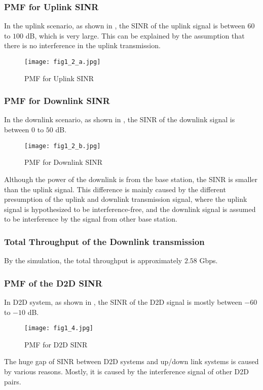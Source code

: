 \documentclass[conference]{IEEEtran}
\begin{document}
\subsubsection{PMF for Uplink SINR}
In the uplink scenario, as shown in , the SINR of the uplink signal is between $60$ to $100$ dB, which is very large. This can be explained by the assumption that there is no interference in the uplink transmission.
\begin{figure}[htbp]
    \centering
    \texttt{[image: fig1\_2\_a.jpg]}
    \caption{PMF for Uplink SINR}
    \label{fig:uplink_sinr}
\end{figure}

\subsubsection{PMF for Downlink SINR}
In the downlink scenario, as shown in , the SINR of the downlink signal is between $0$ to $50$ dB.
\begin{figure}[htbp]
    \centering
    \texttt{[image: fig1\_2\_b.jpg]}
    \caption{PMF for Downlink SINR}
    \label{fig:downlink_sinr}
\end{figure}
Although the power of the downlink is from the base station, the SINR is smaller than the uplink signal. This difference is mainly caused by the different presumption of the uplink and downlink transmission signal, where the uplink signal is hypothesized to be interference-free, and the downlink signal is assumed to be interference by the signal from other base station.
\subsubsection{Total Throughput of the Downlink transmission}
By the simulation, the total throughput is approximately $2.58$ Gbps.
\subsubsection{PMF of the D2D SINR}
In D2D system, as shown in , the SINR of the D2D signal is mostly between $-60$ to $-10$ dB.

\begin{figure}[htbp]
    \centering
    \texttt{[image: fig1\_4.jpg]}
    \caption{PMF for D2D SINR}
    \label{fig:d2d_sinr}
\end{figure}
The huge gap of SINR between D2D systems and up/down link systems is caused by various reasons. Mostly, it is caused by the interference signal of other D2D pairs.
\end{document}
